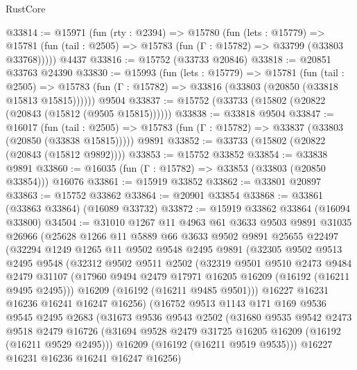 \begin{lexlean}{RustCore}
\begin{coremodule}
@33814 := @15971
    (fun (rty : @2394) =>
    @15780
      (fun (lets : @15779) =>
      @15781 (fun (tail : @2505) => @15783 (fun (Γ : @15782) => @33799 (@33803 @33768)))))
    @4437
@33816 := @15752 (@33733 @20846)
@33818 := @20851 @33763 @24390
@33830 := @15993
    (fun (lets : @15779) =>
    @15781
      (fun (tail : @2505) =>
      @15783 (fun (Γ : @15782) => @33816 (@33803 (@20850 (@33818 @15813 @15815))))))
    @9504
@33837 := @15752 (@33733 (@15802 (@20822 (@20843 (@15812 (@9505 @15815))))))
@33838 := @33818 @9504
@33847 := @16017
    (fun (tail : @2505) => @15783 (fun (Γ : @15782) => @33837 (@33803 (@20850 (@33838 @15815)))))
    @9891
@33852 := @33733 (@15802 (@20822 (@20843 (@15812 @9892))))
@33853 := @15752 @33852
@33854 := @33838 @9891
@33860 := @16035 (fun (Γ : @15782) => @33853 (@33803 (@20850 @33854))) @16076
@33861 := @15919 @33852
@33862 := @33801 @20897
@33863 := @15752 @33862
@33864 := @20901 @33854
@33868 := @33861 (@33863 @33864) (@16089 @33732)
@33872 := @15919 @33862 @33864 (@16094 @33800)
@34504 := @31010
    @1267
    @11
    @4963
    @61
    @3633
    @9503
    @9891
    @31035
    @26966
    (@25628
      @1266
      @11
      @5889
      @66
      @3633
      @9502
      @9891
      @25655
      @22497
      (@32294
        @1249
        @1265
        @11
        @9502
        @9548
        @2495
        @9891
        (@32305
          @9502
          @9513
          @2495
          @9548
          (@32312
            @9502
            @9511
            @2502
            (@32319
              @9501
              @9510
              @2473
              @9484
              @2479
              @31107
              (@17960 @9494 @2479 @17971 @16205 @16209 (@16192 (@16211 @9495 @2495)))
              @16209
              (@16192 (@16211 @9485 @9501)))
            @16227
            @16231
            @16236
            @16241
            @16247
            @16256)
          (@16752
            @9513
            @1143
            @171
            @169
            @9536
            @9545
            @2495
            @2683
            (@31673
              @9536
              @9543
              @2502
              (@31680
                @9535
                @9542
                @2473
                @9518
                @2479
                @16726
                (@31694 @9528 @2479 @31725 @16205 @16209 (@16192 (@16211 @9529 @2495)))
                @16209
                (@16192 (@16211 @9519 @9535)))
              @16227
              @16231
              @16236
              @16241
              @16247
              @16256)

\end{coremodule}
\end{lexlean}
